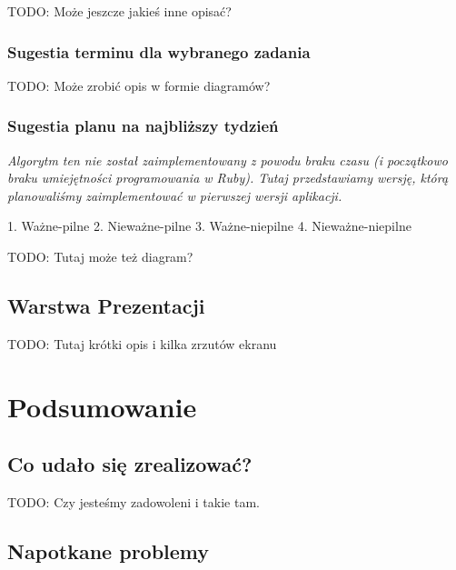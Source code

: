 \documentclass[pdflatex,11pt]{aghdpl}
\begin{document}
TODO: Może jeszcze jakieś inne opisać?

\subsection{Sugestia terminu dla wybranego zadania}

TODO: Może zrobić opis w formie diagramów?

\subsection{Sugestia planu na najbliższy tydzień}
\label{sec:algPlanTygodniowy}

\textit{Algorytm ten nie został zaimplementowany z powodu braku czasu (i początkowo braku umiejętności programowania w Ruby). Tutaj przedstawiamy wersję, którą planowaliśmy zaimplementować w pierwszej wersji aplikacji.}

1. Ważne-pilne 2. Nieważne-pilne 3. Ważne-niepilne 4. Nieważne-niepilne

TODO: Tutaj może też diagram?

\section{Warstwa Prezentacji}

TODO: Tutaj krótki opis i kilka zrzutów ekranu



\chapter{Podsumowanie}

\section{Co udało się zrealizować?}

TODO: Czy jesteśmy zadowoleni i takie tam.

\section{Napotkane problemy}
\end{document}
